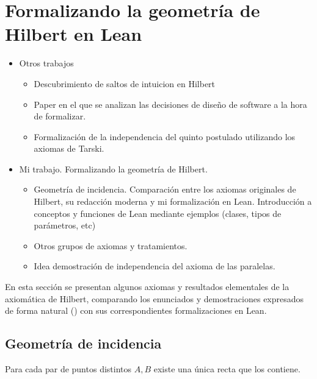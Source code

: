 \newpage
\section{Formalizando la geometría de Hilbert en Lean}
\begin{itemize}
	\item Otros trabajos
	      \begin{itemize}
		      \item Descubrimiento de saltos de intuicion en Hilbert
		      \item Paper en el que se analizan las decisiones de diseño de
		            software a la hora de formalizar.
		      \item Formalización de la independencia del quinto postulado
		            utilizando los axiomas de Tarski.
	      \end{itemize}
	\item Mi trabajo. Formalizando la geometría de Hilbert.
	      \begin{itemize}

		      \item Geometría de incidencia. Comparación entre los
		            axiomas originales de Hilbert, su redacción moderna y
		            mi formalización en Lean. Introducción a conceptos
		            y funciones de Lean mediante ejemplos (clases,
		            tipos de parámetros, etc)
		      \item Otros grupos de axiomas y tratamientos.
		      \item Idea demostración de independencia del axioma de
		            las paralelas.
	      \end{itemize}
\end{itemize}

En esta sección se presentan algunos axiomas y resultados elementales de la
axiomática de Hilbert, comparando los enunciados y demostraciones expresados de
forma natural () con sus correspondientes
formalizaciones en Lean.

\subsection{Geometría de incidencia}



\begin{ax}\label{I1}
	Para cada par de puntos distintos $A, B$ existe una única recta que los
	contiene.
\end{ax}

